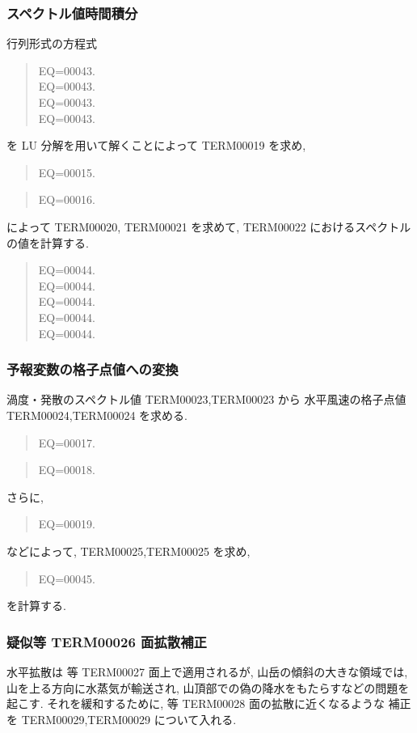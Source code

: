 \subsubsection{スペクトル値時間積分}

行列形式の方程式
\begin{quote}
\nonumber
EQ=00043.\\
\nonumber
EQ=00043.\\
\nonumber
EQ=00043.\\
EQ=00043.
\end{quote}
%
を LU 分解を用いて解くことによって 
TERM00019 を求め,
%
\begin{quote}
EQ=00015.
\end{quote}
%
\begin{quote}
EQ=00016.
\end{quote}

%
によって
TERM00020,
TERM00021 
を求めて, TERM00022 におけるスペクトルの値を計算する.
\begin{quote}
EQ=00044.\\
EQ=00044.\\
EQ=00044.\\
EQ=00044.\\
EQ=00044.
\end{quote}

\subsubsection{予報変数の格子点値への変換}


渦度・発散のスペクトル値 TERM00023,TERM00023 から
水平風速の格子点値 TERM00024,TERM00024 を求める.
\begin{quote}
EQ=00017.
\end{quote}
%
\begin{quote}
EQ=00018.
\end{quote}

さらに,
\begin{quote}
EQ=00019.
\end{quote}
などによって, TERM00025,TERM00025 を求め,
\begin{quote}
EQ=00045.
\end{quote}
を計算する.

\subsubsection{疑似等 TERM00026 面拡散補正}

水平拡散は 等 TERM00027 面上で適用されるが,
山岳の傾斜の大きな領域では, 山を上る方向に水蒸気が輸送され,
山頂部での偽の降水をもたらすなどの問題を起こす.
それを緩和するために, 等 TERM00028 面の拡散に近くなるような
補正を TERM00029,TERM00029 について入れる.

